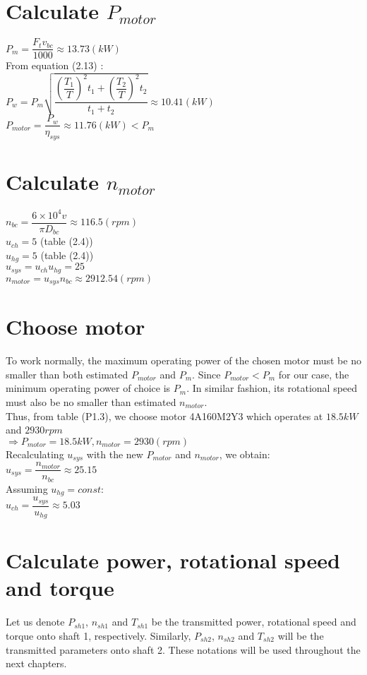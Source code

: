 \section{Calculate $ P_{motor} $}
$ P_m = \dfrac{F_tv_{bc}}{1000} \approx 13.73 \unit{(kW)}$\\
From equation (2.13) :\\
$ P_w = P_m\sqrt{\dfrac{\left(\dfrac{T_1}{T}\right)^2t_1 + \left(\dfrac{T_2}{T}\right)^2t_2}{t_1+t_2}} \approx 10.41 \unit{(kW)} $\\
$ P_{motor} = \dfrac{P_w}{\eta_{sys}} \approx 11.76\unit{(kW)} < P_m$

\section{Calculate $ n_{motor} $}
$ n_{bc} = \dfrac{6\times10^4v}{\pi D_{bc}} \approx 116.5 \unit{(rpm)}$\\
$ u_{ch} = 5$ (table (2.4))\\
$ u_{hg} = 5$ (table (2.4))\\
$ u_{sys} = u_{ch}u_{hg} = 25 $\\
$ n_{motor} = u_{sys}n_{bc} \approx 2912.54  \unit{(rpm)} $

\section{Choose motor}
To work normally, the maximum operating power of the chosen motor must be no smaller than both estimated $ P_{motor} $ and $ P_m $. Since $ P_{motor} < P_m $ for our case, the minimum operating power of choice is $ P_m $. In similar fashion, its rotational speed must also be no smaller than estimated $ n_{motor} $.\\
Thus, from table (P1.3), we choose motor 4A160M2Y3 which operates at $ 18.5\unit{kW} $ and $ 2930\unit{rpm} $\\
$\Rightarrow P_{motor} = 18.5\unit{kW}, n_{motor} = 2930\unit{(rpm)}$\\
Recalculating $ u_{sys} $ with the new $ P_{motor} $ and $ n_{motor} $, we obtain:\\
$ u_{sys} = \dfrac{n_{motor}}{n_{bc}} \approx 25.15	$\\
Assuming $ u_{hg} = const $:\\
$ u_{ch} = \dfrac{u_{sys}}{u_{hg}} \approx 5.03$

\section{Calculate power, rotational speed and torque}
Let us denote $ P_{sh1} $, $ n_{sh1} $ and $ T_{sh1} $ be the transmitted power, rotational speed and torque onto shaft 1, respectively. Similarly, $ P_{sh2} $, $ n_{sh2} $ and $ T_{sh2} $ will be the transmitted parameters onto shaft 2. These notations will be used throughout the next chapters.
